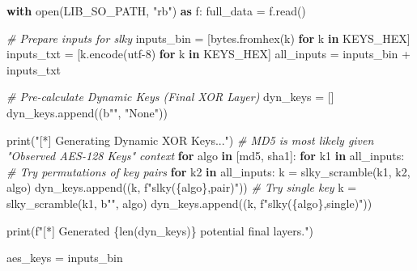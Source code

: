 \documentclass[
]{article}
\newenvironment{Shaded}{}{}
\newcommand{\BuiltInTok}[1]{\textcolor[rgb]{0.00,0.50,0.00}{#1}}
\newcommand{\CommentTok}[1]{\textcolor[rgb]{0.38,0.63,0.69}{\textit{#1}}}
\newcommand{\ControlFlowTok}[1]{\textcolor[rgb]{0.00,0.44,0.13}{\textbf{#1}}}
\newcommand{\ImportTok}[1]{\textcolor[rgb]{0.00,0.50,0.00}{\textbf{#1}}}
\newcommand{\KeywordTok}[1]{\textcolor[rgb]{0.00,0.44,0.13}{\textbf{#1}}}
\newcommand{\NormalTok}[1]{#1}
\newcommand{\OperatorTok}[1]{\textcolor[rgb]{0.40,0.40,0.40}{#1}}
\newcommand{\SpecialCharTok}[1]{\textcolor[rgb]{0.25,0.44,0.63}{#1}}
\newcommand{\SpecialStringTok}[1]{\textcolor[rgb]{0.73,0.40,0.53}{#1}}
\newcommand{\StringTok}[1]{\textcolor[rgb]{0.25,0.44,0.63}{#1}}
\begin{document}
\begin{Shaded}
\begin{Highlighting}[]
    \ControlFlowTok{with} \BuiltInTok{open}\NormalTok{(LIB\_SO\_PATH, }\StringTok{"rb"}\NormalTok{) }\ImportTok{as}\NormalTok{ f:}
\NormalTok{        full\_data }\OperatorTok{=}\NormalTok{ f.read()}

    \CommentTok{\# Prepare inputs for slky}
\NormalTok{    inputs\_bin }\OperatorTok{=}\NormalTok{ [}\BuiltInTok{bytes}\NormalTok{.fromhex(k) }\ControlFlowTok{for}\NormalTok{ k }\KeywordTok{in}\NormalTok{ KEYS\_HEX]}
\NormalTok{    inputs\_txt }\OperatorTok{=}\NormalTok{ [k.encode(}\StringTok{\textquotesingle{}utf{-}8\textquotesingle{}}\NormalTok{) }\ControlFlowTok{for}\NormalTok{ k }\KeywordTok{in}\NormalTok{ KEYS\_HEX]}
\NormalTok{    all\_inputs }\OperatorTok{=}\NormalTok{ inputs\_bin }\OperatorTok{+}\NormalTok{ inputs\_txt}
    
    \CommentTok{\# Pre{-}calculate Dynamic Keys (Final XOR Layer)}
\NormalTok{    dyn\_keys }\OperatorTok{=}\NormalTok{ []}
\NormalTok{    dyn\_keys.append((}\StringTok{b""}\NormalTok{, }\StringTok{"None"}\NormalTok{))}
    
    \BuiltInTok{print}\NormalTok{(}\StringTok{"[*] Generating Dynamic XOR Keys..."}\NormalTok{)}
    \CommentTok{\# MD5 is most likely given "Observed AES{-}128 Keys" context}
    \ControlFlowTok{for}\NormalTok{ algo }\KeywordTok{in}\NormalTok{ [}\StringTok{\textquotesingle{}md5\textquotesingle{}}\NormalTok{, }\StringTok{\textquotesingle{}sha1\textquotesingle{}}\NormalTok{]:}
        \ControlFlowTok{for}\NormalTok{ k1 }\KeywordTok{in}\NormalTok{ all\_inputs:}
             \CommentTok{\# Try permutations of key pairs}
            \ControlFlowTok{for}\NormalTok{ k2 }\KeywordTok{in}\NormalTok{ all\_inputs:}
\NormalTok{                k }\OperatorTok{=}\NormalTok{ slky\_scramble(k1, k2, algo)}
\NormalTok{                dyn\_keys.append((k, }\SpecialStringTok{f"slky(}\SpecialCharTok{\{}\NormalTok{algo}\SpecialCharTok{\}}\SpecialStringTok{,pair)"}\NormalTok{))}
            \CommentTok{\# Try single key}
\NormalTok{            k }\OperatorTok{=}\NormalTok{ slky\_scramble(k1, }\StringTok{b""}\NormalTok{, algo)}
\NormalTok{            dyn\_keys.append((k, }\SpecialStringTok{f"slky(}\SpecialCharTok{\{}\NormalTok{algo}\SpecialCharTok{\}}\SpecialStringTok{,single)"}\NormalTok{))}
            
    \BuiltInTok{print}\NormalTok{(}\SpecialStringTok{f"[*] Generated }\SpecialCharTok{\{}\BuiltInTok{len}\NormalTok{(dyn\_keys)}\SpecialCharTok{\}}\SpecialStringTok{ potential final layers."}\NormalTok{)}

\NormalTok{    aes\_keys }\OperatorTok{=}\NormalTok{ inputs\_bin}
    

\end{Highlighting}
\end{Shaded}
\end{document}
